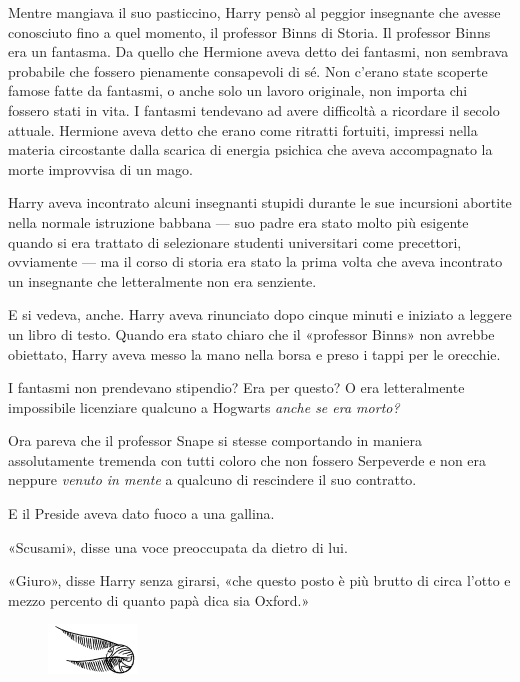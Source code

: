 Mentre mangiava il suo pasticcino, Harry pensò al peggior insegnante che avesse conosciuto fino a quel momento, il professor Binns di Storia. Il professor Binns era un fantasma. Da quello che Hermione aveva detto dei fantasmi, non sembrava probabile che fossero pienamente consapevoli di sé. Non c’erano state scoperte famose fatte da fantasmi, o anche solo un lavoro originale, non importa chi fossero stati in vita. I fantasmi tendevano ad avere difficoltà a ricordare il secolo attuale. Hermione aveva detto che erano come ritratti fortuiti, impressi nella materia circostante dalla scarica di energia psichica che aveva accompagnato la morte improvvisa di un mago.

Harry aveva incontrato alcuni insegnanti stupidi durante le sue incursioni abortite nella normale istruzione babbana — suo padre era stato molto più esigente quando si era trattato di selezionare studenti universitari come precettori, ovviamente — ma il corso di storia era stato la prima volta che aveva incontrato un insegnante che letteralmente non era senziente.

E si vedeva, anche. Harry aveva rinunciato dopo cinque minuti e iniziato a leggere un libro di testo. Quando era stato chiaro che il «professor Binns» non avrebbe obiettato, Harry aveva messo la mano nella borsa e preso i tappi per le orecchie.

I fantasmi non prendevano stipendio? Era per questo? O era letteralmente impossibile licenziare qualcuno a Hogwarts \textit{anche se era morto?}

Ora pareva che il professor Snape si stesse comportando in maniera assolutamente tremenda con tutti coloro che non fossero Serpeverde e non era neppure \textit{venuto in mente} a qualcuno di rescindere il suo contratto.

E il Preside aveva dato fuoco a una gallina.

«Scusami», disse una voce preoccupata da dietro di lui.

«Giuro», disse Harry senza girarsi, «che questo posto è più brutto di circa l’otto e mezzo percento di quanto papà dica sia Oxford.»

\begin{figure}[h!]
        \includegraphics[scale=0.4]{boccino.png}
        \centering
\end{figure}

